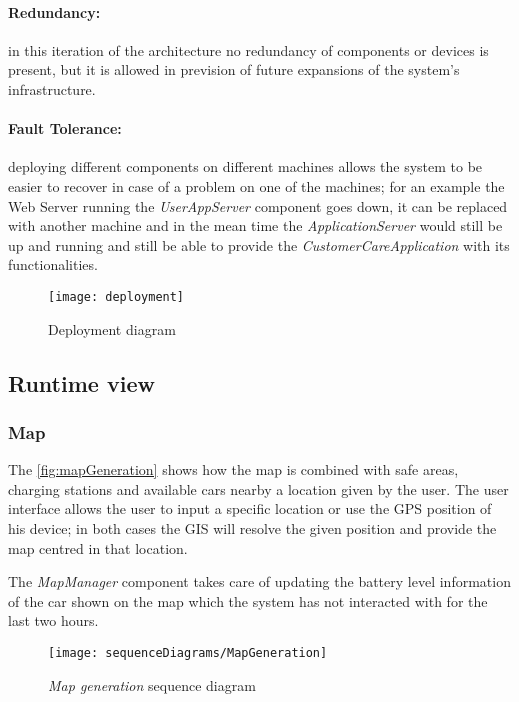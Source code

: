 \paragraph{Redundancy:}in this iteration of the architecture no redundancy of components or devices is present, but it is allowed in prevision of future expansions of the system's infrastructure.
\paragraph{Fault Tolerance:}deploying different components on different machines allows the system to be easier to recover in case of a problem on one of the machines; for an example the Web Server running the \textit{UserAppServer} component goes down, it can be replaced with another machine and in the mean time the \textit{ApplicationServer} would still be up and running and still be able to provide the \textit{CustomerCareApplication} with its functionalities.
\clearpage

\begin{figure}[t!]
	\centering
	\texttt{[image: deployment]}
	\caption{
		\label{fig:deployment} 
		Deployment diagram
	}
\end{figure}

\clearpage
\subsection{Runtime view}

\subsubsection{Map}
The \autoref{fig:mapGeneration} shows how the map is combined with safe areas, charging stations and available cars nearby a location given by the user. The user interface allows the user to input a specific location or use the GPS position of his device; in both cases the GIS will resolve the given position and provide the map centred in that location.

The \emph{MapManager} component takes care of updating the battery level information of the car shown on the map which the system has not interacted with for the last two hours.\\


\begin{figure}[h!]
	\centering
	\texttt{[image: sequenceDiagrams/MapGeneration]}
	\caption{
		\label{fig:mapGeneration} 
		\emph{Map generation} sequence diagram
	}
\end{figure}

